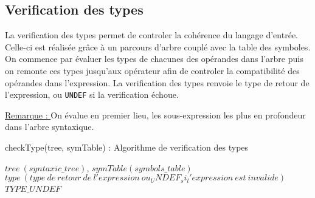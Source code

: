 \newpage
\subsection{Verification des types}

La verification des types permet de controler la cohérence du langage d'entrée. Celle-ci est réalisée grâce à un parcours d'arbre couplé avec la table des symboles.
On commence par évaluer les types de chacunes des opérandes dans l'arbre puis on remonte ces types jusqu'aux opérateur afin de controler la compatibilité des opérandes dans l'expression. La verification des types renvoie le type de retour de l'expression, ou \verb?UNDEF? si la verification échoue.

\underline{Remarque : } On évalue en premier lieu, les sous-expression les plus en profondeur dans l'arbre syntaxique.
~~\\

\begin{algorithm}
\caption{checkType(tree, symTable) : Algorithme de verification des types}
\label{algo_verif_types}
\begin{algorithmic}
\REQUIRE $tree\ (syntaxic\_tree)$, $symTable (symbols\_table)$
\ENSURE $type\ (type\ de\ retour\ de\ l'expression\ ou_ UNDEF_ si_ l'expression\ est\ invalide)$
\RETURN $TYPE\_UNDEF$
\ENDIF	
{}
\STATE $ $
\ENDIF
\end{algorithmic}
\end{algorithm}

